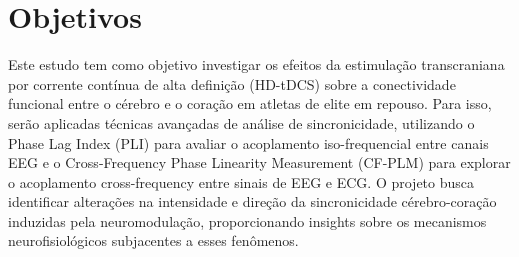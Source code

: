 \chapter{Objetivos}
\label{chap:objetivos}

Este estudo tem como objetivo investigar os efeitos da estimulação transcraniana por corrente contínua de alta definição (HD-tDCS) sobre a conectividade funcional entre o cérebro e o coração em atletas de elite em repouso. Para isso, serão aplicadas técnicas avançadas de análise de sincronicidade, utilizando o Phase Lag Index (PLI) para avaliar o acoplamento iso-frequencial entre canais EEG e o Cross-Frequency Phase Linearity Measurement (CF-PLM) para explorar o acoplamento cross-frequency entre sinais de EEG e ECG. O projeto busca identificar alterações na intensidade e direção da sincronicidade cérebro-coração induzidas pela neuromodulação, proporcionando insights sobre os mecanismos neurofisiológicos subjacentes a esses fenômenos.
